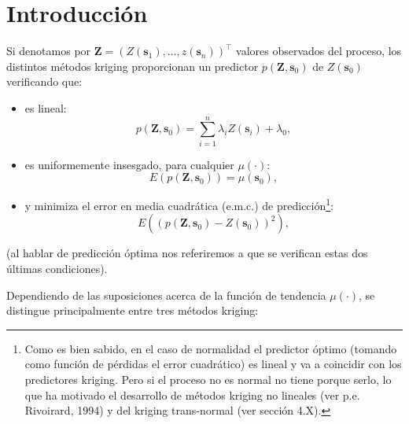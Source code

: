 \documentclass[
  spanish,
]{book}
\theoremstyle{break}
\begin{document}
\hypertarget{introducciuxf3n}{%
\section{Introducción}\label{introducciuxf3n}}

Si denotamos por \(\mathbf{Z}=\left( Z(\mathbf{s}_{1} ), \ldots, z(\mathbf{s}_{n} )\right)^\top\) valores observados del proceso, los distintos métodos kriging proporcionan un predictor \(p(\mathbf{Z},\mathbf{s}_{0} )\) de \(Z(\mathbf{s}_{0} )\) verificando que:

\begin{itemize}
\item
  es lineal:
  \[p(\mathbf{Z},\mathbf{s}_{0} )=\sum\limits_{i=1}^{n}\lambda_{i} Z(\mathbf{s}_{i} ) +\lambda_{0},\]
\item
  es uniformemente insesgado, para cualquier \(\mu(\cdot)\):
  \[E(p(\mathbf{Z},\mathbf{s}_{0} ))=\mu(\mathbf{s}_{0} ),\]
\item
  y minimiza el error en media cuadrática (e.m.c.) de predicción\footnote{Como es bien sabido, en el caso de normalidad el predictor óptimo (tomando como función de pérdidas el error cuadrático) es lineal y va a coincidir con los predictores kriging. Pero si el proceso no es normal no tiene porque serlo, lo que ha motivado el desarrollo de métodos kriging no lineales (ver p.e. Rivoirard, 1994) y del kriging trans-normal (ver sección 4.X).}:
  \[E\left( \left( p(\mathbf{Z},\mathbf{s}_{0} )-Z(\mathbf{s}_{0} )\right)^{\text{2} } \right),\]
\end{itemize}

(al hablar de predicción óptima nos referiremos a que se verifican estas dos últimas condiciones).

Dependiendo de las suposiciones acerca de la función de tendencia \(\mu(\cdot)\), se distingue principalmente entre tres métodos kriging:
\end{document}
